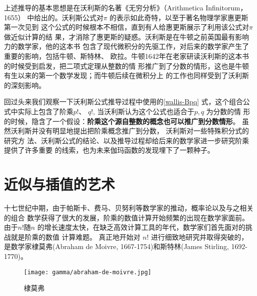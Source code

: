 {上述推导的基本思想是在沃利斯的名著《无穷分析》（Arithmetica Infinitorum，1655）
中给出的。沃利斯公式对$\pi$ 的表示如此奇特，以至于著名物理学家惠更斯第一次见到
这个公式的时候根本不相信，直到有人给惠更斯展示了利用该公式对$\pi$做近似计算的结
果，才消除了惠更斯的疑惑。沃利斯是在牛顿之前英国最有影响力的数学家，他的这本书
包含了现代微积分的先驱工作，对后来的数学家产生了重要的影响，包括牛顿、斯特林、
欧拉。牛顿1642年在老家研读沃利斯的这本书的时候受到启发，把二项式定理从整数的情
形推广到了分数的情形，这也是牛顿有生以来的第一个数学发现；而牛顿后续在微积分上
的工作也同样受到了沃利斯的深刻影响。 

回过头来我们观察一下沃利斯公式推导过程中使用的\eqref{wallis-Bpq} 式，这个组合公
式中实际上包含了阶乘$p!$、 $q!$, 当沃利斯认为这个公式也适合于$p, q$ 为分数的情
形的时候，隐含了一个假设：{\bf 阶乘这个源自整数的概念也可以推广到分数情形}。
虽然沃利斯并没有明显地提出把阶乘概念推广到分数， 沃利斯对一些特殊积分式的研究方
法、沃利斯公式的结论、以及推导过程却给后来的数学家进一步研究阶乘提供了许多重要
的线索，也为未来伽玛函数的发现埋下了一颗种子。 

\section{近似与插值的艺术}

十七世纪中期，由于帕斯卡、费马、贝努利等数学家的推动，概率论以及与之相关的组合
数学获得了很大的发展，阶乘的数值计算开始频繁的出现在数学家面前。 由于$n!$随$n$
的增长速度太快，在缺乏高效计算工具的年代，数学家们首先面对的挑战就是阶乘的数值
计算难题。 真正地开始对 $n!$ 进行细致地研究并取得突破的，是数学家棣莫弗(Abraham
de Moivre, 1667-1754)和斯特林(James Stirling, 1692-1770)。

\begin{figure}[htbp]
\centering
\vspace{1cm}
\texttt{[image: gamma/abraham-de-moivre.jpg]}
\caption{棣莫弗}
\end{figure}

}
